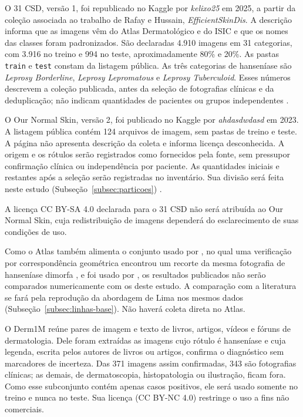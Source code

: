 O 31 CSD, versão 1, foi republicado no Kaggle por \textit{kelixo25} em
2025, a partir da coleção associada ao trabalho de Rafay e Hussain,
\textit{EfficientSkinDis}. A descrição informa que as imagens vêm do Atlas
Dermatológico e do ISIC e que os nomes das classes foram padronizados.
São declaradas 4.910 imagens em 31 categorias, com 3.916 no treino e 994 no
teste, aproximadamente 80\% e 20\%. As pastas \texttt{train} e \texttt{test}
constam da listagem pública. As três categorias de hanseníase são
\textit{Leprosy Borderline}, \textit{Leprosy Lepromatous} e
\textit{Leprosy Tuberculoid}. Esses números descrevem a coleção publicada,
antes da seleção de fotografias clínicas e da deduplicação; não indicam
quantidades de pacientes ou grupos independentes \cite{kelixo31CSD2025}.

O Our Normal Skin, versão 2, foi publicado no Kaggle por
\textit{ahdasdwdasd} em 2023. A listagem pública contém 124 arquivos de imagem, sem pastas
de treino e teste. A página não apresenta descrição da coleta e informa
licença desconhecida. A origem e os rótulos serão registrados como
fornecidos pela fonte, sem pressupor confirmação clínica ou independência
por paciente. As quantidades iniciais e restantes após a seleção serão
registradas no inventário. Sua divisão será feita neste estudo
(Subseção~\ref{subsec:particoes}) \cite{ourNormalSkin2023}.

A licença CC BY-SA 4.0 declarada para o 31 CSD não será atribuída ao Our
Normal Skin, cuja redistribuição de imagens dependerá do esclarecimento
de suas condições de uso.

Como o Atlas também alimenta o
conjunto usado por , no qual uma verificação por
correspondência geométrica encontrou um recorte da mesma fotografia de
hanseníase dimorfa \cite{fredrickSkinDisease2025,atlasHanseniaseDimorfa}, e
foi usado por , os resultados publicados não serão
comparados numericamente com os deste estudo. A comparação com a literatura
se fará pela reprodução da abordagem de Lima nos mesmos dados
(Subseção~\ref{subsec:linhas-base}). Não haverá coleta direta no Atlas.

O Derm1M \cite{yan2025derm1m} reúne pares de imagem e texto de livros,
artigos, vídeos e fóruns de dermatologia. Dele foram extraídas as imagens
cujo rótulo é hanseníase e cuja legenda, escrita pelos autores de livros ou
artigos, confirma o diagnóstico sem marcadores de incerteza. Das 371
imagens assim confirmadas, 343 são fotografias clínicas; as demais, de
dermatoscopia, histopatologia ou ilustração, ficam fora. Como esse
subconjunto contém apenas casos positivos, ele será usado somente no
treino e nunca no teste. Sua licença
(CC BY-NC 4.0) restringe o uso a fins não comerciais.

